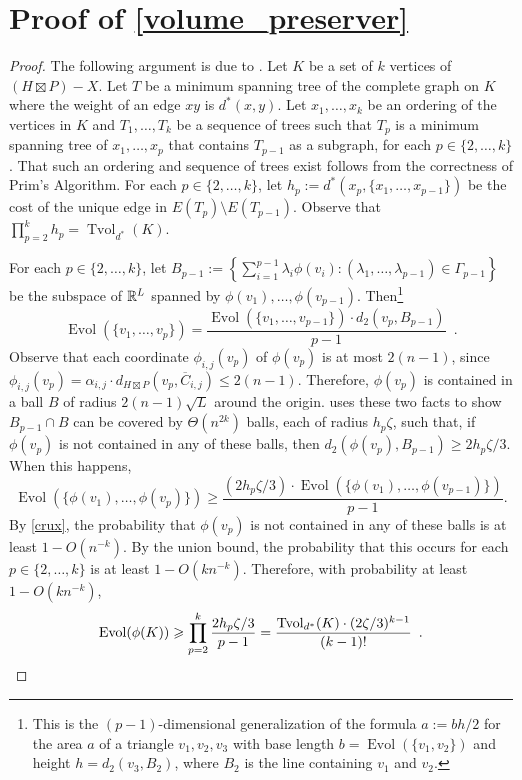 \documentclass{patmorin}
\renewcommand{\ge}{\geqslant}
\renewcommand{\le}{\leqslant}
\DeclareMathOperator{\evol}{Evol}
\DeclareMathOperator{\tvol}{Tvol}
\begin{document}

\section{Proof of \texorpdfstring{\cref{volume_preserver}}{Claim?}}
\label{volume_preserver_proof}

\volumepreserverClaim*

\begin{proof}
  The following argument is due to \citet[Pages~529--530]{feige:approximating}.  Let $K$ be a set of $k$ vertices of $(H\boxtimes P)-X$. Let $T$ be a minimum spanning tree of the complete graph on $K$ where the weight of an edge $xy$ is $d^*(x,y)$.  Let $x_1,\ldots,x_k$ be an ordering of the vertices in $K$ and $T_1,\ldots,T_k$ be a sequence of trees such that $T_{p}$ is a minimum spanning tree of $x_1,\ldots,x_{p}$ that contains $T_{p-1}$ as a subgraph, for each $p\in\{2,\ldots,k\}$.  That such an ordering and sequence of trees exist follows from the correctness of Prim's Algorithm. For each $p\in\{2,\ldots,k\}$, let $h_p:=d^*(x_p,\{x_1,\ldots,x_{p-1}\})$ be the cost of the unique edge in $E(T_p)\setminus E(T_{p-1})$.  Observe that $\prod_{p=2}^k h_p = \tvol_{d^*}(K)$.

  For each $p\in\{2,\ldots,k\}$, let $B_{p-1}:=\left\{\sum_{i=1}^{p-1}\lambda_i\phi(v_i):(\lambda_1,\ldots,\lambda_{p-1})\in\Gamma_{p-1}\right\}$ be the subspace of $\mathbb{R}^L$ spanned by $\phi(v_1),\ldots,\phi(v_{p-1})$.  Then\footnote{This is the $(p-1)$-dimensional generalization of the formula $a:=bh/2$ for the area $a$ of a triangle $v_1,v_2,v_3$ with base length $b=\evol(\{v_1,v_2\})$ and height $h=d_2(v_3,B_2)$, where $B_2$ is the line containing $v_1$ and $v_2$.}
  \[
    \evol(\{v_1,\ldots,v_p\})=\frac{\evol(\{v_1,\ldots,v_{p-1}\})\cdot d_2(v_p,B_{p-1})}{p-1} \enspace .
  \]
  Observe that each coordinate $\phi_{i,j}(v_p)$ of $\phi(v_p)$ is at most $2(n-1)$, since $\phi_{i,j}(v_p)=\alpha_{i,j}\cdot d_{H\boxtimes P}(v_p, \overline{C}_{i,j})\le 2(n-1)$. Therefore, $\phi(v_p)$ is contained in a ball $B$ of radius $2(n-1)\sqrt{L}$ around the origin. \citet{feige:approximating} uses these two facts to show $B_{p-1}\cap B$ can be covered by $\Theta(n^{2k})$ balls, each of radius $h_p\zeta$, such that, if $\phi(v_p)$ is not contained in any of these balls, then $d_2(\phi(v_p),B_{p-1})\ge 2h_p\zeta/3$.  When this happens,
  \[
    \evol(\{\phi(v_1),\ldots,\phi(v_p)\})\ge \frac{(2h_p\zeta/3)\cdot\evol(\{\phi(v_1),\ldots,\phi(v_{p-1})\})}{p-1}.
  \]
  By \cref{crux}, the probability that $\phi(v_p)$ is not contained in any of these balls is at least $1-O(n^{-k})$. By the union bound, the probability that this occurs for each $p\in\{2,\ldots,k\}$ is at least $1-O(kn^{-k})$.  Therefore, with probability at least $1-O(kn^{-k})$,
  \[
    \evol(\phi(K)) \ge \prod_{p=2}^{k}\frac{2h_p\zeta/3}{p-1} = \frac{\tvol_{d^*}(K)\cdot (2\zeta/3)^{k-1}}{(k-1)!} \enspace . \qedhere
  \]
\end{proof}
\end{document}

